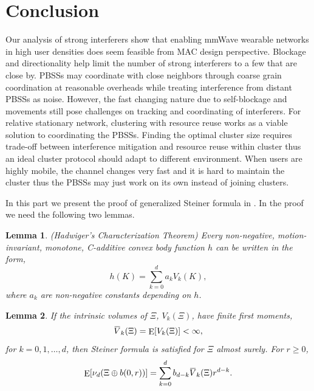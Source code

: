 \documentclass[10pt, conference, letterpaper]{IEEEtran}
\newtheorem{lemma}{Lemma}
\DeclareMathOperator*{\E}{\mathrm{E}}
\newcommand{\overbar}[1]{\mkern 1.5mu\overline{\mkern-1.5mu#1\mkern-1.5mu}\mkern 1.5mu}
\begin{document}
\section{Conclusion}\label{section:conclusion}
Our analysis of strong interferers show that enabling mmWave wearable networks in high user densities does seem feasible from MAC design perspective. Blockage and directionality help limit the number of strong interferers to a few that are close by. PBSSs may coordinate with close neighbors through coarse grain coordination at reasonable overheads while treating interference from distant PBSSs as 
noise. However, the fast changing nature due to self-blockage and movements still pose challenges on tracking and coordinating of interferers. For relative stationary network, clustering with resource reuse works as a viable solution to coordinating the PBSSs. Finding the optimal cluster size requires trade-off between interference mitigation and resource reuse within cluster thus an ideal cluster protocol should adapt to different environment. When users are highly mobile, the channel changes very fast and it is hard to maintain the cluster thus the PBSSs may just work on its own instead of joining clusters. 

In this part we present the proof of generalized Steiner formula in \cite{stochasticapp}. In the proof we need the following two lemmas. 
\begin{lemma}\label{lemma:characterization}
	(Hadwiger's Characterization Theorem) Every non-negative, motion-invariant, monotone, C-additive convex body function $h$ can be written in the form, 
	\begin{equation}\label{characterization}
	h(K) = \sum\limits_{k=0}^{d}a_kV_k(K),
	\end{equation}
	where $a_k$ are non-negative constants depending on $h$.
\end{lemma}
\begin{lemma}\label{lemma:steiner}
	If the intrinsic volumes of $\Xi$, $V_k(\Xi)$, have finite first moments,
	\begin{equation*}
	\overbar{V}_k(\Xi) = \E[V_k(\Xi)]<\infty,
	\end{equation*}
	for $k=0,1,\ldots, d$, then Steiner formula is satisfied for $\Xi$ almost surely. For $r\geq 0$, 
	\begin{equation}
	\E[\nu_d(\Xi \oplus b(0,r))] = \sum\limits_{k=0}^{d}b_{d-k}\overbar{V}_k(\Xi)r^{d-k}.
	\end{equation}
\end{lemma}
\end{document}
